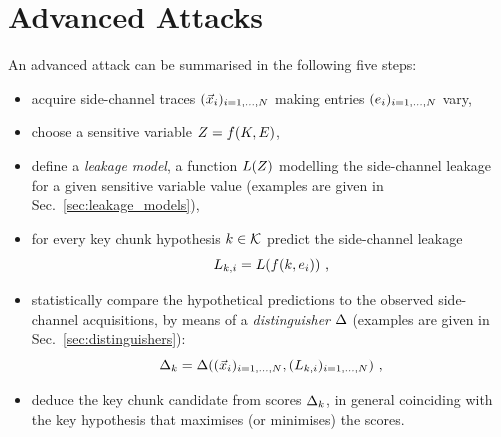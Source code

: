 \section{Advanced Attacks}\label{sec:advanced}
An advanced attack can be summarised in the following five steps: 
\begin{itemize}
\item acquire side-channel traces $(\vec{x}_i)_{i=1,\dots , N}$ making entries $(e_i)_{i=1,\dots,N}$ vary,
\item choose a sensitive variable $Z = f(K,E)$, 
\item define a \emph{leakage model}, \ie a function $L(Z)$ modelling the side-channel leakage for a given sensitive variable value (examples are given in Sec.~\ref{sec:leakage_models}),
\item for every key chunk hypothesis $k \in \mathcal{K}$ predict the side-channel leakage 
\begin{equation}\label{eq:predictions}
L_{k,i} = L(f(k,e_i)) \mbox{ ,}
\end{equation}
\item statistically compare the hypothetical predictions to the observed side-channel acquisitions, by means of a  \emph{distinguisher} $\Delta$ (examples are given in Sec.~\ref{sec:distinguishers}):
\begin{equation}
\Delta_{k} = \Delta((\vec{x}_i)_{i=1,\dots , N}, (L_{k,i} )_{i=1,\dots , N}) \mbox{ ,}
\end{equation}
\item deduce the key chunk candidate from scores $\Delta_{k}$, in general coinciding with the key hypothesis that maximises (or minimises) the scores.
\end{itemize}


